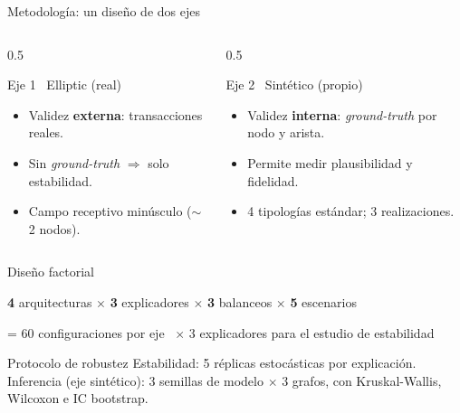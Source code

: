 \documentclass[aspectratio=169,11pt]{beamer}
\begin{document}
\begin{frame}{Metodología: un diseño de dos ejes}
\begin{columns}[T]
\begin{column}{0.5\textwidth}
\begin{block}{Eje 1 \textperiodcentered\ Elliptic (real)}
\begin{itemize}\small
  \item Validez \textbf{externa}: transacciones reales.
  \item Sin \textit{ground-truth} $\Rightarrow$ solo estabilidad.
  \item Campo receptivo minúsculo ($\sim$2 nodos).
\end{itemize}
\end{block}
\end{column}
\begin{column}{0.5\textwidth}
\begin{block}{Eje 2 \textperiodcentered\ Sintético (propio)}
\begin{itemize}\small
  \item Validez \textbf{interna}: \textit{ground-truth} por nodo y arista.
  \item Permite medir plausibilidad y fidelidad.
  \item 4 tipologías estándar; 3 realizaciones.
\end{itemize}
\end{block}
\end{column}
\end{columns}
\end{frame}

\begin{frame}{Diseño factorial}
\begin{center}
{\color{teal}\Large\textbf{4}} arquitecturas \; $\times$ \; {\color{amber}\Large\textbf{3}} explicadores \; $\times$ \; {\color{seafoam}\Large\textbf{3}} balanceos \; $\times$ \; {\color{coral}\Large\textbf{5}} escenarios
\end{center}
\vspace{2pt}
\begin{center}\small = 60 configuraciones por eje \, $\times$ 3 explicadores para el estudio de estabilidad\end{center}
\vspace{6pt}
\begin{block}{Protocolo de robustez}
\small Estabilidad: 5 réplicas estocásticas por explicación. Inferencia (eje sintético): 3 semillas de modelo $\times$ 3 grafos, con Kruskal-Wallis, Wilcoxon e IC bootstrap.
\end{block}
\end{frame}
\end{document}
